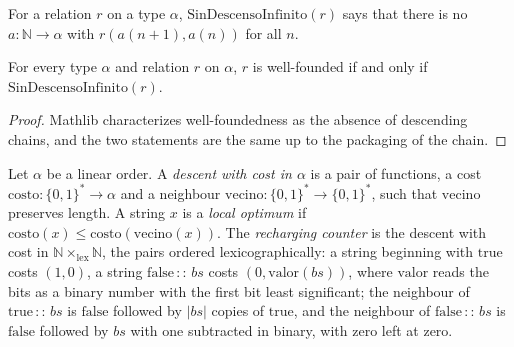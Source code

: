 \begin{definition}
  \label{def:infinite-sin-descenso-infinito}
  \leanok
  \own{}
  \infrastructure{}
  For a relation $r$ on a type $\alpha$, $\mathrm{SinDescensoInfinito}(r)$ says that there is no
  $a : \mathbb{N} \to \alpha$ with $r(a(n+1), a(n))$ for all $n$.
\end{definition}

\begin{theorem}
  \label{thm:infinite-bien-fundado}
  \leanok
  \own{}
  \infrastructure{}
  For every type $\alpha$ and relation $r$ on $\alpha$, $r$ is well-founded if and only if
  $\mathrm{SinDescensoInfinito}(r)$.
\end{theorem}

\begin{proof}
  \leanok
  Mathlib characterizes well-foundedness as the absence of descending chains, and the two statements are the same
  up to the packaging of the chain.
\end{proof}

\begin{definition}
  \label{def:infinite-descenso-en}
  \leanok
  \own{}
  \infrastructure{}
  Let $\alpha$ be a linear order. A \emph{descent with cost in $\alpha$} is a pair of functions, a cost
  $\mathrm{costo} : \{0,1\}^* \to \alpha$ and a neighbour $\mathrm{vecino} : \{0,1\}^* \to \{0,1\}^*$, such that
  $\mathrm{vecino}$ preserves length. A string $x$ is a \emph{local optimum} if $\mathrm{costo}(x) \le \mathrm{costo}(\mathrm{vecino}(x))$.
  The \emph{recharging counter} is the descent with cost in $\mathbb{N} \times_{\mathrm{lex}} \mathbb{N}$, the pairs
  ordered lexicographically: a string beginning with $\mathrm{true}$ costs $(1, 0)$, a string $\mathrm{false}\,{:}{:}\,bs$
  costs $(0, \mathrm{valor}(bs))$, where $\mathrm{valor}$ reads the bits as a binary number with the first bit least
  significant; the neighbour of $\mathrm{true}\,{:}{:}\,bs$ is $\mathrm{false}$ followed by $|bs|$ copies of
  $\mathrm{true}$, and the neighbour of $\mathrm{false}\,{:}{:}\,bs$ is $\mathrm{false}$ followed by $bs$ with one
  subtracted in binary, with zero left at zero.
\end{definition}

